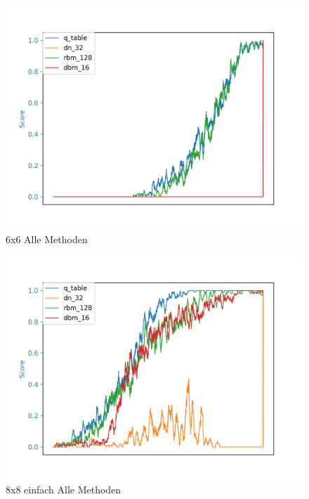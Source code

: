 \begin{figure}[H]
\centering
\includegraphics[width=\textwidth]{Figures/all_6x6_q_table_dn_32_rbm_128_dbm_16.png}
\caption{6x6 Alle Methoden}
\label{all_12}
\end{figure}

\begin{figure}[H]
\centering
\includegraphics[width=\textwidth]{Figures/all_8x8_q_table_dn_32_rbm_128_dbm_16.png}
\caption{8x8 einfach Alle Methoden}
\label{all_13}
\end{figure}


